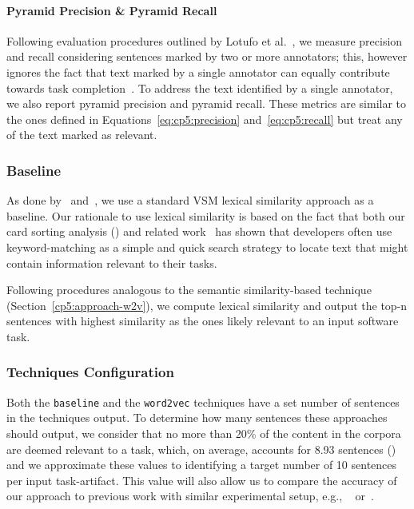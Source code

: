 \paragraph{\textbf{Pyramid Precision \& Pyramid Recall}} 

Following evaluation procedures outlined by Lotufo et al.~\cite{Lotufo2012}, we measure precision and recall considering sentences marked by two or more annotators; this, however ignores the fact that text marked by a single annotator can equally contribute towards task completion~\cite{marques2020}. To address the text identified by a single annotator, we also report pyramid precision and pyramid recall. These metrics are similar to the ones defined in 
Equations~\ref{eq:cp5:precision} and~\ref{eq:cp5:recall} but treat any of the text marked as relevant.






\subsubsection{Baseline}


As done by~\cite{Lin2021} and~\cite{Ye2016}, we use a standard VSM lexical similarity approach as a baseline. Our rationale to use 
lexical similarity is based on the fact that 
both our card sorting analysis () and related work~\cite{Ko2006a, Freund2015} has shown that developers often use keyword-matching as a simple and quick search strategy to locate text that might contain information relevant to their tasks.


Following procedures analogous to the semantic similarity-based technique (Section~\ref{cp5:approach-w2v}), we compute lexical similarity and output the top-n sentences with highest similarity as the ones likely relevant to an input software task.




\subsubsection{Techniques Configuration}




Both the \texttt{baseline} and the \texttt{word2vec} techniques have a set number of sentences in the techniques output. To determine how many sentences these approaches should output, we consider that 
no more than 20\% of the content in the corpora are deemed relevant to a task, which, on average, accounts for 8.93 sentences () and we approximate these values to identifying a target number of 10 sentences per input task-artifact. 
This value will also allow us to compare the accuracy of our approach to previous work with similar experimental setup, e.g., ~\cite{Xu2017} or~\cite{Lotufo2012}.




